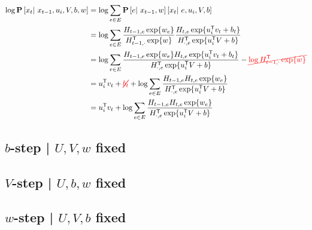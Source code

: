 \documentclass{article}
\newcommand{\ccancel}[2][black]{\color{#1}\cancel{#2}\normalcolor}
\begin{document}
\begin{align*}
\log\P\left[x_t \given x_{t-1}, u_i, V, b, w\right] &= \log\sum_{e\in E} \P\left[e \given x_{t-1}, w \right]\left[x_t \given e, u_i, V, b \right]\\
&= \log\sum_{e\in E} \frac{H_{t-1,e} \exp\{w_e\} }{H_{t-1,\cdot}\trans \exp\{w\}} \frac{H_{t,e} \exp\{u_i\trans v_t + b_t \} }{H_{\cdot,e}\trans \exp\{u_i\trans V + b \} }\\
&= \log\sum_{e\in E} \frac{H_{t-1,e} \exp\{w_e\} H_{t,e} \exp\{u_i\trans v_t + b_t \} }{H_{\cdot,e}\trans \exp\{u_i\trans V + b \} } - \ccancel[red]{\log H_{t-1,\cdot}\trans
\exp\{w\}}\\
&= u_i\trans v_t + \ccancel[red]{b_t} + \log\sum_{e\in E} \frac{H_{t-1,e} H_{t, e} \exp\{w_e\} }{H_{\cdot,e}\trans \exp\{u_i\trans V + b \} }\\
&= u_i\trans v_t + \log\sum_{e\in E} \frac{H_{t-1,e} H_{t, e} \exp\{w_e\} }{H_{\cdot,e}\trans \exp\{u_i\trans V + b \} }\\
\end{align*}


\subsection{$b$-step | $U, V, w$ fixed}

\subsection{$V$-step | $U, b, w$ fixed}

\subsection{$w$-step | $U, V, b$ fixed}
\end{document}

